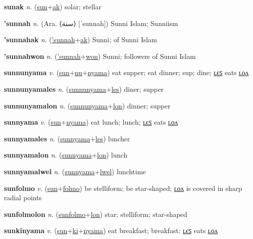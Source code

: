 \textbf{\hypertarget{sunak}{sunak}} \textit{n.} (\hyperlink{sun}{sun}+\allowbreak \hyperlink{ak}{ak})
solar; stellar

\textbf{\hypertarget{'sunnah}{'sunnah}} \textit{n.} (Ara. ⟨{\arabics{}سنة}⟩ [ˈsunnah])
Sunni Islam; Sunniism

\textbf{\hypertarget{'sunnahak}{'sunnahak}} \textit{n.} (\hyperlink{'sunnah}{'sunnah}+\allowbreak \hyperlink{ak}{ak})
Sunni; of Sunni Islam

\textbf{\hypertarget{'sunnahwon}{'sunnahwon}} \textit{n.} (\hyperlink{'sunnah}{'sunnah}+\allowbreak \hyperlink{won}{won})
Sunni; followers of Sunni Islam

\textbf{\hypertarget{sunnunyama}{sunnunyama}} \textit{v.} (\hyperlink{sun}{sun}+\allowbreak \hyperlink{nu}{nu}+\allowbreak \hyperlink{nyama}{nyama})
eat supper; eat dinner; sup; dine; \hyperlink{sunnunyamales}{ʟєꜱ} eats \hyperlink{sunnunyamalon}{ʟᴏᴧ}

\textbf{\hypertarget{sunnunyamales}{sunnunyamales}} \textit{n.} (\hyperlink{sunnunyama}{sunnunyama}+\allowbreak \hyperlink{les}{les})
diner; supper

\textbf{\hypertarget{sunnunyamalon}{sunnunyamalon}} \textit{n.} (\hyperlink{sunnunyama}{sunnunyama}+\allowbreak \hyperlink{lon}{lon})
dinner; supper

\textbf{\hypertarget{sunnyama}{sunnyama}} \textit{v.} (\hyperlink{sun}{sun}+\allowbreak \hyperlink{nyama}{nyama})
eat lunch; lunch; \hyperlink{sunnyamales}{ʟєꜱ} eats \hyperlink{sunnyamalon}{ʟᴏᴧ}

\textbf{\hypertarget{sunnyamales}{sunnyamales}} \textit{n.} (\hyperlink{sunnyama}{sunnyama}+\allowbreak \hyperlink{les}{les})
luncher

\textbf{\hypertarget{sunnyamalon}{sunnyamalon}} \textit{n.} (\hyperlink{sunnyama}{sunnyama}+\allowbreak \hyperlink{lon}{lon})
lunch

\textbf{\hypertarget{sunnyamalwel}{sunnyamalwel}} \textit{n.} (\hyperlink{sunnyama}{sunnyama}+\allowbreak \hyperlink{lwel}{lwel})
lunchtime

\textbf{\hypertarget{sunfolmo}{sunfolmo}} \textit{v.} (\hyperlink{sun}{sun}+\allowbreak \hyperlink{folmo}{folmo})
be stelliform; be star-shaped; \hyperlink{sunfolmolon}{ʟᴏᴧ} is covered in sharp radial points

\textbf{\hypertarget{sunfolmolon}{sunfolmolon}} \textit{n.} (\hyperlink{sunfolmo}{sunfolmo}+\allowbreak \hyperlink{lon}{lon})
star; stelliform; star-shaped

\textbf{\hypertarget{sunkinyama}{sunkinyama}} \textit{v.} (\hyperlink{sun}{sun}+\allowbreak \hyperlink{ki}{ki}+\allowbreak \hyperlink{nyama}{nyama})
eat breakfast; breakfast; \hyperlink{sunkinyamales}{ʟєꜱ} eats \hyperlink{sunkinyamalon}{ʟᴏᴧ}

